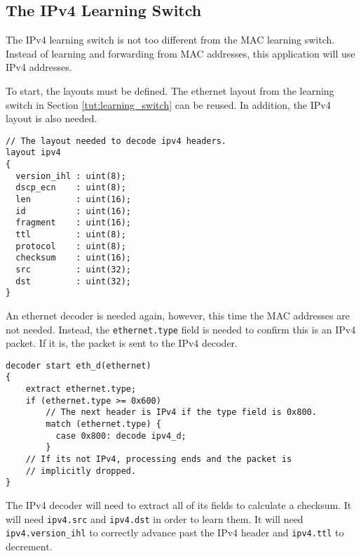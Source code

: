 \subsection{The IPv4 Learning Switch} \label{tut:learning_router}

The IPv4 learning switch is not too different from the MAC learning switch. Instead of
learning and forwarding from MAC addresses, this application will use IPv4
addresses.

To start, the layouts must be defined. The ethernet layout
from the learning switch in Section \ref{tut:learning_switch} can be reused. 
In addition, the IPv4 layout is also needed.

\begin{codepage}
\begin{lstlisting}
// The layout needed to decode ipv4 headers.
layout ipv4
{
  version_ihl : uint(8);
  dscp_ecn    : uint(8);
  len         : uint(16);
  id          : uint(16);
  fragment    : uint(16);
  ttl         : uint(8);
  protocol    : uint(8);
  checksum    : uint(16);
  src         : uint(32);
  dst         : uint(32);
}
\end{lstlisting}
\end{codepage}

An ethernet decoder is needed again, however, this time the MAC
addresses are not needed. Instead, the \texttt{ethernet.type} field is needed to confirm
this is an IPv4 packet. If it is, the packet is sent to the IPv4 decoder.

\begin{codepage}
\begin{lstlisting}
decoder start eth_d(ethernet)
{
	extract ethernet.type;
	if (ethernet.type >= 0x600)
	  	// The next header is IPv4 if the type field is 0x800.
	    match (ethernet.type) {
	      case 0x800: decode ipv4_d;
	    }
	// If its not IPv4, processing ends and the packet is
	// implicitly dropped.
}
\end{lstlisting}
\end{codepage}

The IPv4 decoder will need to extract all of its fields to calculate a checksum. It will need \texttt{ipv4.src} and \texttt{ipv4.dst} in
order to learn them. It will need \texttt{ipv4.version\_ihl} to
correctly advance past the IPv4 header and \texttt{ipv4.ttl} to decrement.

